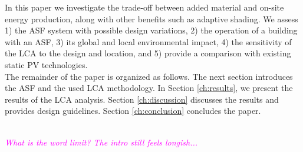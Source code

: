 In this paper we investigate the trade-off between added material and on-site energy production, along with other benefits such as adaptive shading. We assess 1) the ASF system with possible design variations, 2) the operation of a building with an ASF, 3) its global and local environmental impact, 4) the sensitivity of the LCA to the design and location, and 5) provide a comparison with existing static PV technologies. \\

The remainder of the paper is organized as follows. The next section introduces the ASF and the used LCA methodology. In Section \ref{ch:results}, we present the results of the LCA analysis. Section \ref{ch:discussion} discusses the results and provides design guidelines. Section \ref{ch:conclusion} concludes the paper.

\textcolor{magenta}{\textit{\\What is the word limit? The intro still feels longish...}}







